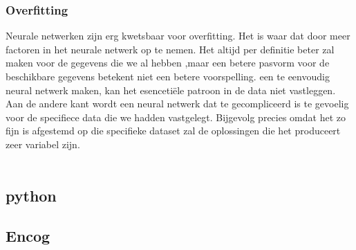 \subsubsection{Overfitting}
Neurale netwerken zijn erg kwetsbaar voor overfitting. Het is waar dat door meer factoren in het neurale netwerk op te nemen. Het altijd per definitie beter zal maken voor de gegevens die we al hebben ,maar een betere pasvorm voor de beschikbare gegevens betekent niet een betere voorspelling. een te eenvoudig neural netwerk maken, kan het esencetiële patroon in de data niet vastleggen. Aan de andere kant wordt een neural netwerk dat te gecompliceerd is te gevoelig voor de specifiece data die we hadden vastgelegt. Bijgevolg precies omdat het zo fijn is afgestemd op die specifieke dataset zal de oplossingen die het produceert zeer variabel zijn.\\\\


\subsection{python}

\subsection{Encog}
